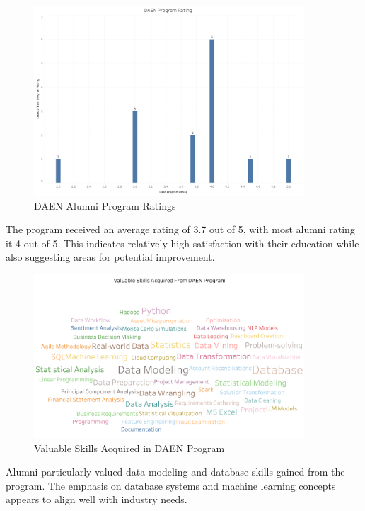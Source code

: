 \documentclass[12pt,a4paper]{article}
\begin{document}
\begin{figure}[H]
    \centering
    \includegraphics[width=0.9\textwidth]{visualizations/daen-rating.png}
    \caption{DAEN Alumni Program Ratings}
    \label{fig:daen-rating}
\end{figure}

The program received an average rating of 3.7 out of 5, with most alumni rating it 4 out of 5. This indicates relatively high satisfaction with their education while also suggesting areas for potential improvement.

\begin{figure}[H]
    \centering
    \includegraphics[width=0.9\textwidth]{visualizations/program-skills.png}
    \caption{Valuable Skills Acquired in DAEN Program}
    \label{fig:program-skills}
\end{figure}

Alumni particularly valued data modeling and database skills gained from the program. The emphasis on database systems and machine learning concepts appears to align well with industry needs. 
\end{document}
